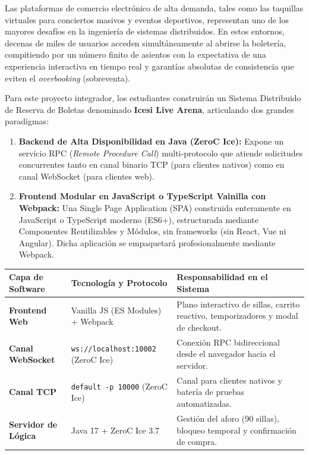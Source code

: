\documentclass[10pt,letterpaper]{article}
\begin{document}
Las plataformas de comercio electrónico de alta demanda, tales como las taquillas virtuales para conciertos masivos y eventos deportivos, representan uno de los mayores desafíos en la ingeniería de sistemas distribuidos. En estos entornos, decenas de miles de usuarios acceden simultáneamente al abrirse la boletería, compitiendo por un número finito de asientos con la expectativa de una experiencia interactiva en tiempo real y garantías absolutas de consistencia que eviten el \textit{overbooking} (sobreventa).

Para este proyecto integrador, los estudiantes construirán un Sistema Distribuido de Reserva de Boletas denominado \textbf{Icesi Live Arena}, articulando dos grandes paradigmas:
\begin{enumerate}[leftmargin=*]
  \item \textbf{Backend de Alta Disponibilidad en Java (ZeroC Ice):} Expone un servicio RPC (\textit{Remote Procedure Call}) multi-protocolo que atiende solicitudes concurrentes tanto en canal binario TCP (para clientes nativos) como en canal WebSocket (para clientes web).
  \item \textbf{Frontend Modular en JavaScript o TypeScript Vainilla con Webpack:} Una Single Page Application (SPA) construida enteramente en JavaScript o TypeScript moderno (ES6+), estructurada mediante Componentes Reutilizables y Módulos, sin frameworks (sin React, Vue ni Angular). Dicha aplicación se empaquetará profesionalmente mediante Webpack.
\end{enumerate}

\begin{center}
\small
\begin{tabularx}{0.96\textwidth}{@{}|l|l|X|@{}}
\hline
\rowcolor{icesiLight}
\textbf{Capa de Software} & \textbf{Tecnología y Protocolo} & \textbf{Responsabilidad en el Sistema} \\
\hline
\textbf{Frontend Web} & Vanilla JS (ES Modules) + Webpack & Plano interactivo de sillas, carrito reactivo, temporizadores y modal de checkout. \\
\hline
\textbf{Canal WebSocket} & \texttt{ws://localhost:10002} (ZeroC Ice) & Conexión RPC bidireccional desde el navegador hacia el servidor. \\
\hline
\textbf{Canal TCP} & \texttt{default -p 10000} (ZeroC Ice) & Canal para clientes nativos y batería de pruebas automatizadas. \\
\hline
\textbf{Servidor de Lógica} & Java 17 + ZeroC Ice 3.7 & Gestión del aforo (90 sillas), bloqueo temporal y confirmación de compra. \\
\hline
\end{tabularx}
\end{center}
\end{document}
